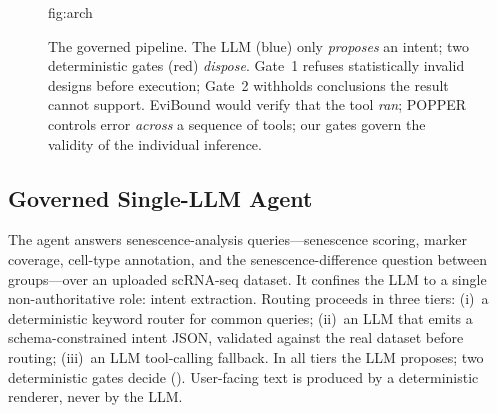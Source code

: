 \documentclass[pmlr,twocolumn,10pt]{jmlr}
\begin{document}
\begin{figure}[htbp]
\floatconts
  {fig:arch}
  {\caption{The governed pipeline. The LLM (blue) only \emph{proposes} an
  intent; two deterministic gates (red) \emph{dispose}. Gate~1 refuses
  statistically invalid designs before execution; Gate~2 withholds conclusions
  the result cannot support. EviBound would verify that the tool \emph{ran};
  POPPER controls error \emph{across} a sequence of tools; our gates govern the
  validity of the individual inference.}}
  {%
  }
\end{figure}

\subsection{Governed Single-LLM Agent}

The agent answers senescence-analysis queries---senescence scoring, marker
coverage, cell-type annotation, and the senescence-difference question between
groups---over an uploaded scRNA-seq dataset. It confines the LLM to a single
non-authoritative role: intent extraction. Routing proceeds in three tiers:
(i)~a deterministic keyword router for common queries; (ii)~an LLM that emits a
schema-constrained intent JSON, validated against the real dataset before
routing; (iii)~an LLM tool-calling fallback. In all tiers the LLM proposes;
two deterministic gates decide (). User-facing text is
produced by a deterministic renderer, never by the LLM.
\end{document}
